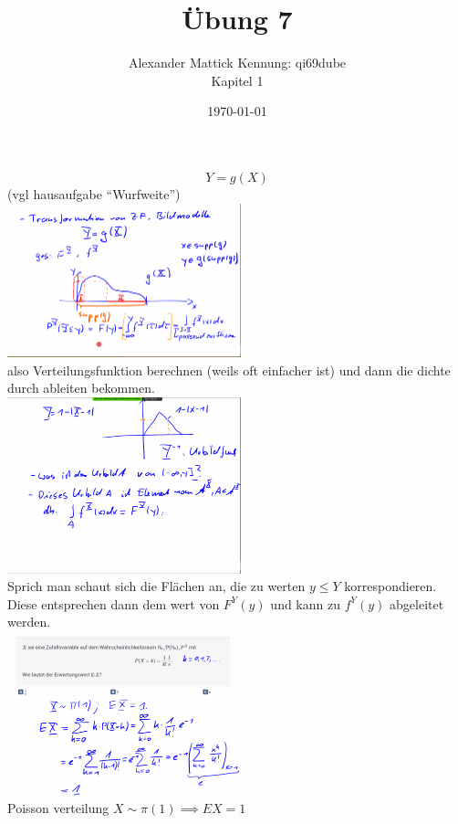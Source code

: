 \documentclass{article}
\author{
Alexander Mattick Kennung: qi69dube\\
Kapitel 1
}
\date{\today}
\title{Übung 7}
\begin{document}
	\maketitle
	\[Y=g(X)\]
	(vgl hausaufgabe ``Wurfweite'')\\
	\includegraphics[width=256px]{TransformationVonZV.png}\\
	also Verteilungsfunktion berechnen (weils oft einfacher ist) und dann die dichte durch ableiten bekommen.\\
	\includegraphics[width=256px]{dreieck.png}\\
	Sprich man schaut sich die Flächen an, die zu werten $y\leq Y$ korrespondieren.\\
	Diese entsprechen dann dem wert von $F^Y(y)$ und kann zu $f^Y(y)$ abgeleitet werden.\\
	\includegraphics[width=256px]{Poisson-Verteilung.png}\\
	Poisson verteilung $X\sim \pi(1)\implies EX=1$\\
	\\
\end{document}
